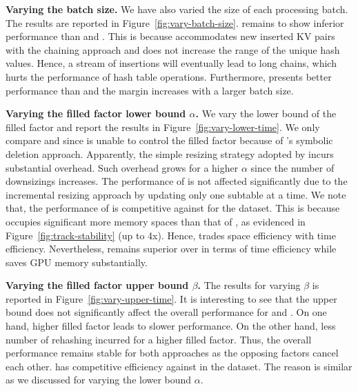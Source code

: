 \vspace{1mm}\noindent\textbf{Varying the batch size.}
We have also varied the size of each processing batch. The results are reported in Figure~\ref{fig:vary-batch-size}. 
\slab remains to show inferior performance than \megakv and \voter. 
This is because \slab accommodates new inserted KV pairs with the chaining approach and does not increase the range of the unique hash values. Hence, a stream of insertions will eventually lead to long chains, which hurts the performance of hash table operations. Furthermore, \voter presents better performance than \megakv and the margin increases with a larger batch size.


\vspace{1mm}\noindent\textbf{Varying the filled factor lower bound $\alpha$.}
We vary the lower bound of the filled factor and report the results in Figure~\ref{fig:vary-lower-time}. 
We only compare \megakv and \voter since \slab is unable to control the filled factor because of \slab's symbolic deletion approach. 
Apparently, the simple resizing strategy adopted by \megakv incurs substantial overhead. Such overhead grows for a higher $\alpha$ since the number of downsizings increases. The performance of \voter is not affected significantly due to the incremental resizing approach by updating only one subtable at a time. We note that, the performance of \megakv is competitive against \voter for the \dsali dataset. This is because \megakv occupies significant more memory spaces than that of \voter, as evidenced in Figure~\ref{fig:track-stability} (up to 4x). Hence, \megakv trades space efficiency with time efficiency.
Nevertheless, \voter remains superior over \megakv in terms of time efficiency while saves GPU memory substantially. 



\vspace{1mm}\noindent\textbf{Varying the filled factor upper bound $\beta$.}
The results for varying $\beta$ is reported in Figure~\ref{fig:vary-upper-time}. 
It is interesting to see that the upper bound does not significantly affect the overall performance for \megakv and \voter. 
On one hand, higher filled factor leads to slower  performance. On the other hand, less number of rehashing incurred for a higher filled factor. Thus, the overall performance remains stable for both approaches as the opposing factors cancel each other. \megakv has competitive efficiency against \voter in the \dsali dataset. The reason is similar as we discussed for varying the lower bound $\alpha$.







